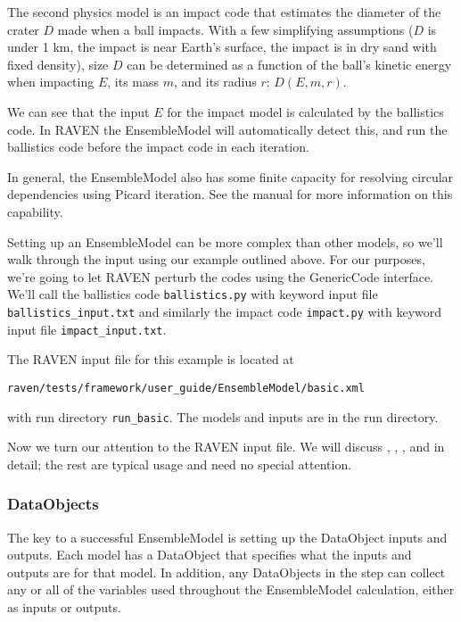 The second physics model is an impact code that estimates the diameter of the crater $D$ made when a ball
impacts.  With a few simplifying assumptions ($D$ is under 1 km, the impact is near Earth's surface, the
impact is in dry sand with fixed density), size $D$ can be determined as a function of the ball's kinetic
energy when impacting $E$, its mass $m$, and its radius $r$: $D(E,m,r)$.

We can see that the input $E$ for the impact model is calculated by the ballistics code.  In RAVEN the
EnsembleModel will automatically detect this, and run the ballistics code before the impact code in each
iteration.

In general, the EnsembleModel also has some finite capacity for resolving circular dependencies using Picard
iteration.  See the manual for more information on this capability.

Setting up an EnsembleModel can be more complex than other models, so we'll walk through the input using our example
outlined above.  For
our purposes, we're going to let RAVEN perturb the codes using the GenericCode interface.  We'll call the
ballistics code \texttt{ballistics.py} with keyword input file \texttt{ballistics\_input.txt} and similarly the impact
code \texttt{impact.py} with keyword input file \texttt{impact\_input.txt}.

The RAVEN input file for this example is located at
\begin{verbatim}
raven/tests/framework/user_guide/EnsembleModel/basic.xml
\end{verbatim}
with run directory \texttt{run\_basic}.  The models and inputs are in the run directory.

Now we turn our attention to the RAVEN input file. We will discuss , ,
, and  in detail; the rest are typical usage and need no special attention.

\subsubsection{DataObjects}
The key to a successful EnsembleModel is setting up the DataObject inputs and outputs.  Each model has a
 DataObject that specifies what the inputs and outputs are for that model.  In
addition, any  DataObjects in the  step can collect any or all of the
variables used throughout the EnsembleModel calculation, either as inputs or outputs.

